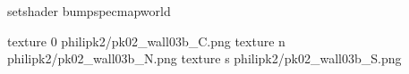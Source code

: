 setshader bumpspecmapworld

texture 0 philipk2/pk02_wall03b_C.png
texture n philipk2/pk02_wall03b_N.png
texture s philipk2/pk02_wall03b_S.png


